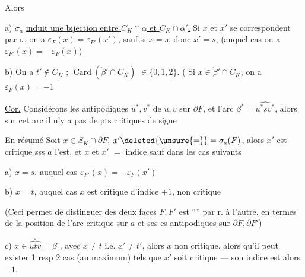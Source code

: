 Alors

a)  $\sigma_a$ \uline{induit une bijection entre $C_K\cap\alpha$ et $C_K\cap\alpha'$.}  Si $x$ et $x'$ se correspondent par $\sigma$, on a $\varepsilon_F(x)=\varepsilon_{F'}(x')$, sauf si $x=s$, donc $x'=s$, (auquel cas on a $\varepsilon_{F'}(x)=-\varepsilon_F(x)$)

b) On a $t'\notin C_K$ ;   $\operatorname{Card}(\mathring{\beta}'\cap C_K)$  $\in\{0,1,2\}$. (   Si $x\in\mathring{\beta}'\cap C_K$, on a $\varepsilon_F(x)=-1$

\uline{Cor.} Considérons les antipodiques $u^*,v^*$ de $u,v$ sur $\partial F$, et l'arc $\beta^*=\widehat{u^*sv^*}$,  alors sur cet arc il n'y a pas de pts critiques de signe 

\uline{En résumé} \quad Soit $x\in S_K\cap\partial F$,  $x'\deleted{\unsure{=}}=\sigma_a(F)$, alors $x'$ est critique sss $a$ l'est, et $x$ et $x'$  $=$ indice sauf dans les cas suivants

a) $x=s$, auquel cas $\varepsilon_{F'}(x)=-\varepsilon_F(x')$

b) $x=t$, auquel cas  $x$ est critique d'indice $+1$,  non critique

(Ceci permet de distinguer   des deux faces $F,F'$ est ``'' par r. à l'autre, en termes de la position de l'arc critique  sur $a$ et ses es antipodiques sur $\partial F,\partial F'$)

c) $x\in\overset{\circ}{\widehat{utv}}=\beta^\circ$, avec $x\ne t$ i.e. $x'\ne t'$, alors $x$ non critique, alors qu'il peut exister 1 resp 2 cas (au maximum) tels que $x'$ soit critique --- son indice est alors $-1$.
